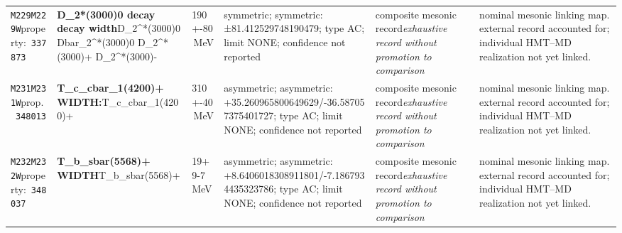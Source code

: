 \begin{landscape}
\begin{longtable}{L{1.85cm}L{4.45cm}L{2.35cm}L{4.05cm}L{3.35cm}L{7.15cm}}
\texttt{M229}\newline \texttt{M229W}\newline property:\ \texttt{337873} & \textbf{D\_\allowbreak{}2*(3000)0 decay decay width}\newline D\_\allowbreak{}2\textasciicircum{}*(3000)0 \textbar{}\allowbreak{} Dbar\_\allowbreak{}2\textasciicircum{}*(3000)0 \textbar{}\allowbreak{} D\_\allowbreak{}2\textasciicircum{}*(3000)+ \textbar{}\allowbreak{} D\_\allowbreak{}2\textasciicircum{}*(3000)- & 190+-80\,MeV & symmetric; symmetric: ±81.412529748190479; type AC; limit NONE; confidence not reported & composite mesonic record\newline \emph{exhaustive record without promotion to comparison} & nominal mesonic linking map. external record accounted for; individual HMT--MD realization not yet linked. \\
\texttt{M231}\newline \texttt{M231W}\newline prop.\ \texttt{348013} & \textbf{T\_\allowbreak{}c\_\allowbreak{}cbar\_\allowbreak{}1(4200)+ WIDTH:}\newline T\_\allowbreak{}c\_\allowbreak{}cbar\_\allowbreak{}1(4200)+ & 310+-40\,MeV & asymmetric; asymmetric: +35.260965800649629/-36.587057375401727; type AC; limit NONE; confidence not reported & composite mesonic record\newline \emph{exhaustive record without promotion to comparison} & nominal mesonic linking map. external record accounted for; individual HMT--MD realization not yet linked. \\
\texttt{M232}\newline \texttt{M232W}\newline property:\ \texttt{348037} & \textbf{T\_\allowbreak{}b\_\allowbreak{}sbar(5568)+ WIDTH}\newline T\_\allowbreak{}b\_\allowbreak{}sbar(5568)+ & 19+9-7\,MeV & asymmetric; asymmetric: +8.6406018308911801/-7.1867934435323786; type AC; limit NONE; confidence not reported & composite mesonic record\newline \emph{exhaustive record without promotion to comparison} & nominal mesonic linking map. external record accounted for; individual HMT--MD realization not yet linked. \\

\end{longtable}
\end{landscape}
